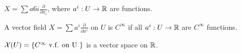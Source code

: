 \documentclass[12pt, twosided]{article}
\begin{document}
\begin{lm}
  \(X = \sum a6i \frac{\partial}{\partial x_i}\), where \(a^i: U \to \mathbb{R}\) are functions.
\end{lm}
\begin{df}
  A vector field \(X = \sum a^i \frac{\partial}{\partial x^i}\) on \(U\) is \(C^\infty\) if all \(a^i:U \to \mathbb{R}\) are \(C^\infty\) functions.
  \end{df}
  \begin{notn}
    \(\mathcal{X}(U) = \left\{ C^\infty \text{ v.f. on U }\right\}\) is a vector space on \(\mathbb{R}\).
  \end{notn}
\end{document}
